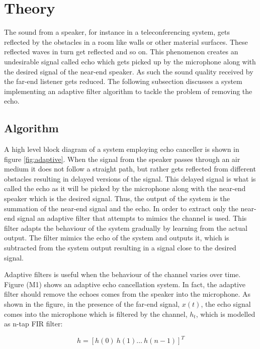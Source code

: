 \documentclass[a4paper,11pt,twoside]{article}
\begin{document}
\section{Theory}
\label{sec:theory}

The sound from a speaker, for instance in a teleconferencing system,  gets reflected by the obstacles in a room like walls or other material surfaces. These reflected waves in turn get reflected and so on. This phenomenon creates an undesirable signal called echo which gets picked up by the microphone along with the desired signal of the near-end speaker. As such the sound quality received by the far-end listener gets reduced. The following subsection discusses a system implementing an adaptive filter algorithm to tackle the problem of removing the echo.

\subsection{Algorithm}

A high level block diagram of a system employing echo canceller is shown in figure \ref{fig:adaptive}. When the signal from the speaker passes through an air medium it does not follow a straight path, but rather gets reflected from different obstacles resulting in delayed versions of the signal. This delayed signal is what is called the echo as it will be picked by the microphone along with the near-end speaker which is the desired signal. Thus, the output of the system is the summation of the near-end signal and the echo. In order to extract only the near-end signal an adaptive filter that attempts to mimics the channel  is used. This filter adapts the behaviour of the system gradually by learning from the actual output. The filter mimics the echo of the system and outputs it, which is subtracted from the system output resulting in a signal close to the desired signal.

Adaptive filters is useful when the behaviour of the channel varies over time. Figure (M1) shows an adaptive echo cancellation system. In fact, the adaptive filter should remove the echoes comes from the speaker into the microphone. As shown in the figure, in the presence of the far-end signal, $x(t)$, the echo signal comes into the microphone which is filtered by the channel, $h_t$, which is modelled as n-tap FIR filter:

\begin{equation}\label{eq:n-tapFIR}
h = [ h(0) \ h(1)\dots \ h(n-1)] ^T   
\end{equation}
\end{document}
